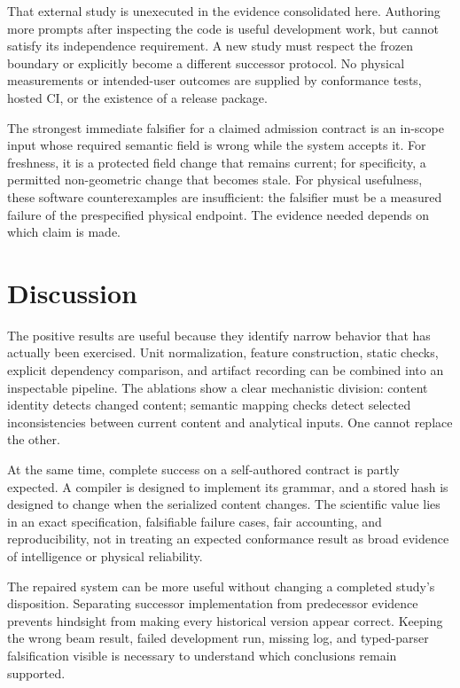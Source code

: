\documentclass[10pt]{article}
\begin{document}
That external study is unexecuted in the evidence consolidated here.
Authoring more prompts after inspecting the code is useful development work,
but cannot satisfy its independence requirement. A new study must respect
the frozen boundary or explicitly become a different successor protocol.
No physical measurements or intended-user outcomes are supplied by
conformance tests, hosted CI, or the existence of a release package.

The strongest immediate falsifier for a claimed admission contract is an
in-scope input whose required semantic field is wrong while the system
accepts it. For freshness, it is a protected field change that remains
current; for specificity, a permitted non-geometric change that becomes
stale. For physical usefulness, these software counterexamples are
insufficient: the falsifier must be a measured failure of the prespecified
physical endpoint. The evidence needed depends on which claim is made.

\section{Discussion}

The positive results are useful because they identify narrow behavior that
has actually been exercised. Unit normalization, feature construction, static
checks, explicit dependency comparison, and artifact recording can be
combined into an inspectable pipeline. The ablations show a clear mechanistic
division: content identity detects changed content; semantic mapping checks
detect selected inconsistencies between current content and analytical inputs.
One cannot replace the other.

At the same time, complete success on a self-authored contract is partly
expected. A compiler is designed to implement its grammar, and a stored hash
is designed to change when the serialized content changes. The scientific
value lies in an exact specification, falsifiable failure cases, fair
accounting, and reproducibility, not in treating an expected conformance result
as broad evidence of intelligence or physical reliability.

The repaired system can be more useful without changing a completed study's
disposition. Separating successor implementation from predecessor evidence
prevents hindsight from making every historical version appear correct.
Keeping the wrong beam result, failed development run, missing log, and
typed-parser falsification visible is necessary to understand which
conclusions remain supported.
\end{document}
